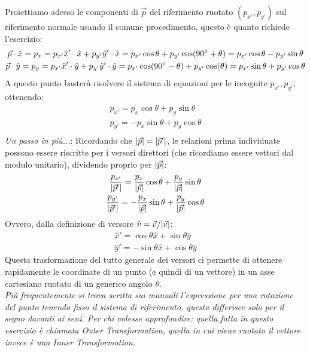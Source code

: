 \documentclass[12pt,a4paper]{book}
\begin{document}
Proiettiamo adesso le componenti di $\vec{p}$ del riferimento ruotato $(p_{x'},p_{y'})$ sul riferimento normale usando il comune procedimento, questo è quanto richiede l'esercizio:
%
\begin{gather*}
\vec{p}\cdot \hat{x}=p_{x}=p_{x'}\hat{x}'\cdot\hat{x}+p_{y'}\hat{y}'\cdot\hat{x}=p_{x'}\cos\theta+p_{y'}\cos(90\degree+\theta)=p_{x'}\cos\theta-p_{y'}\sin\theta\\
\vec{p}\cdot \hat{y}=p_{y}=p_{x'}\hat{x}'\cdot\hat{y}+p_{y'}\hat{y}'\cdot\hat{y}=p_{x'}\cos(90\degree-\theta)+p_{y'}\cos(\theta)=p_{x'}\sin\theta+p_{y'}\cos\theta\\
\end{gather*} 
%
A questo punto basterà risolvere il sistema di equazioni per le incognite $p_{x'},p_{y'}$, ottenendo:
%
\begin{gather*}
p_{x'}=p_{x}\cos\theta+p_{y}\sin\theta\\
p_{y'}=-p_{x}\sin\theta+p_{y}\cos\theta\\
\end{gather*} 
%
\textit{Un passo in più...}: Ricordando che  $\qty|\vec{p}|=\qty|\vec{p}'|$, le relazioni prima individuate possono essere riscritte per i versori direttori (che ricordiamo essere vettori dal modulo unitario), dividendo proprio per $\qty|\vec{p}|$:
%
\begin{gather*}
\frac{p_{x'}}{\qty|\vec{p}'|} =\frac{p_{x}}{\qty|\vec{p}|}\cos\theta+\frac{p_{y}}{\qty|\vec{p}|}\sin\theta\\
\frac{p_{y'}}{\qty|\vec{p}'|}=-\frac{p_{x}}{\qty|\vec{p}|}\sin\theta+\frac{p_{y}}{\qty|\vec{p}|}\cos\theta\\
\end{gather*} 
%
Ovvero, dalla definizione di versore $\hat{v}=\vec{v}/\qty|\vec{v}|$:
%
\begin{gather*}
\hat{x}'=\cos\theta\hat{x}+\sin\theta\hat{y}\\
\hat{y}'=-\sin\theta\hat{x}+\cos\theta\hat{y}
\end{gather*} 
%
Questa trasformazione del tutto generale dei versori ci permette di ottenere rapidamente le coordinate di un punto (e quindi di un vettore) in un asse cartesiano ruotato di un generico angolo $\theta$.
\\

\textit{Più frequentemente si trova scritta sui manuali l'espressione per una rotazione del punto tenendo fisso il sistema di riferimento, questa differisce solo per il segno davanti ai seni. Per chi volesse approfondire: quella fatta in questo esercizio è chiamata Outer Transformation, quella in cui viene ruotato il vettore invece è una Inner Transformation.}
\end{document}
